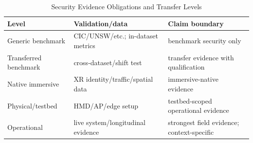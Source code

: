 \begin{table}[H]\centering\caption{Security Evidence Obligations and Transfer Levels}\label{tab:securitysynthesis}\scriptsize\begin{tabularx}{\columnwidth}{p{}p{}Y}\toprule Level & Validation/data & Claim boundary\\\midrule Generic benchmark & CIC/UNSW/etc.; in-dataset metrics & benchmark security only\\ Transferred benchmark & cross-dataset/shift test & transfer evidence with qualification\\ Native immersive & XR identity/traffic/spatial data & immersive-native evidence\\ Physical/testbed & HMD/AP/edge setup & testbed-scoped operational evidence\\ Operational & live system/longitudinal evidence & strongest field evidence; context-specific\\\bottomrule\end{tabularx}\end{table}